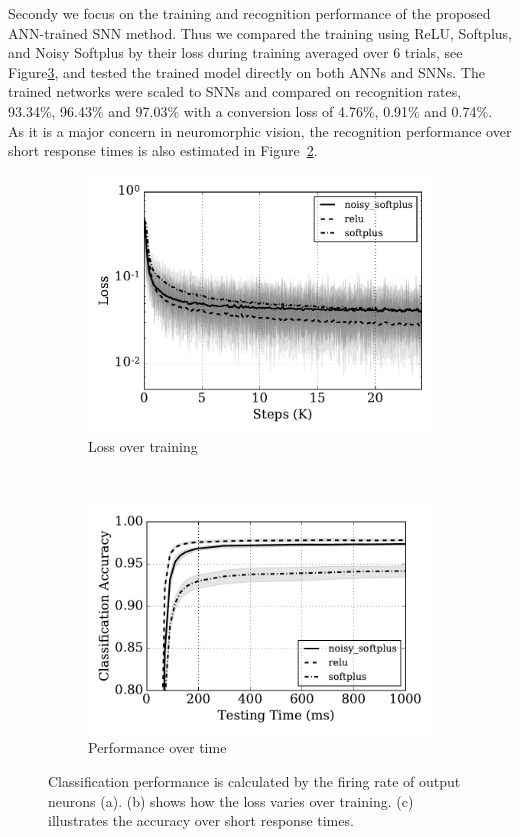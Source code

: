 	
	Secondy we focus on the training and recognition performance of the proposed ANN-trained SNN method.
	Thus we compared the training using ReLU, Softplus, and Noisy Softplus by their loss during training averaged over 6 trials, see Figure\ref{fig:training}, and tested the trained model directly on both ANNs and SNNs.
	The trained networks were scaled to SNNs and compared on recognition rates, 93.34\%, 96.43\% and 97.03\% with a conversion loss of 4.76\%, 0.91\% and 0.74\%.
	As it is a major concern in neuromorphic vision, the recognition performance over short response times is also estimated in Figure~\ref{Fig:response}.
	\begin{figure}[bt!]
		\centering
		\begin{subfigure}[t]{0.7\textwidth}
			\includegraphics[width=\textwidth]{pics_iconip/8.pdf}
		    \caption{Loss over training}
		    \label{Fig:loss}
		\end{subfigure}\\
		\begin{subfigure}[t]{0.7\textwidth}
			\includegraphics[width=\textwidth]{pics_iconip/8-2.pdf}
		    \caption{Performance over time}
		    \label{Fig:response}
		\end{subfigure}

		\caption{
			Classification performance is calculated by the firing rate of output neurons (a).
			(b) shows how the loss varies over training.
			(c) illustrates the accuracy over short response times.}
		\label{fig:training}	
	\end{figure}
